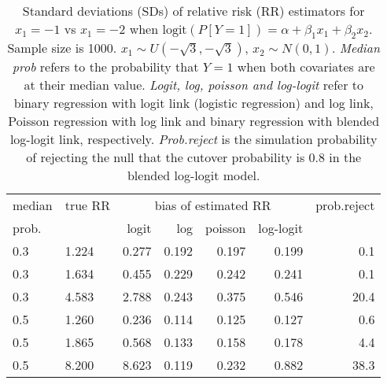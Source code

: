 \documentclass[12pt,a4paper]{article}
\begin{document}
\begin{table}[H] 
\small\sf\centering 
\caption{Standard deviations (SDs) of relative risk (RR) estimators for $x_1=-1$ vs $x_1=-2$ when $\mbox{logit}(P[Y=1])=\alpha+\beta_1 x_1 + \beta_2 x_2$. Sample size is 1000. $x_1 \sim $$U(-\sqrt{3},-\sqrt{3})$, $x_2 \sim N(0,1)$. {\it Median prob} refers to the probability that $Y=1$ when both covariates are at their median value. {\it Logit, log, poisson and log-logit} refer to binary regression with logit link (logistic regression) and log link, Poisson regression with log link and binary regression with blended log-logit link, respectively. {\it Prob.reject} is the simulation probability of rejecting the null that the cutover probability is $0.8$ in the blended log-logit model.} 
\begin{tabular}{llrrrrr} 
\toprule 
median & true RR & \multicolumn{4}{c}{bias of estimated RR} & prob.reject \\ 
prob. & & logit & log & poisson & log-logit  & \\ \midrule 
0.3 & 1.224 & 0.277 & 0.192 & 0.197 & 0.199 &  0.1 \\  
0.3 & 1.634 & 0.455 & 0.229 & 0.242 & 0.241 &  0.1 \\  
0.3 & 4.583 & 2.788 & 0.243 & 0.375 & 0.546 & 20.4 \\  
0.5 & 1.260 & 0.236 & 0.114 & 0.125 & 0.127 &  0.6 \\  
0.5 & 1.865 & 0.568 & 0.133 & 0.158 & 0.178 &  4.4 \\  
0.5 & 8.200 & 8.623 & 0.119 & 0.232 & 0.882 & 38.3 \\  
\bottomrule 
\end{tabular} 
\end{table} 
\end{document}
